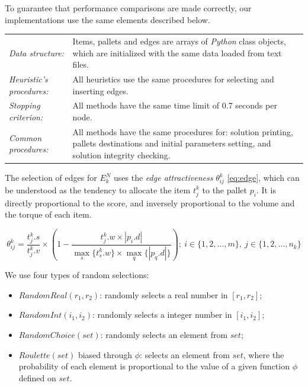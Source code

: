 \documentclass[preprint,authoryear]{elsarticle}
\begin{document}
To guarantee that performance comparisons are made correctly, our implementations use the same elements described below.


\bgroup
\def\arraystretch{1.2}
\begin{table}[H]
	\centering
	\small
	\begin{tabular}{CD}
		
		{\it Data structure:}     & Items, pallets and edges are arrays of \emph{Python} class objects, which are initialized with the same data loaded from text files. \\
		
		{\it Heuristic's procedures:}  & All heuristics use the same procedures for selecting and inserting edges.  \\	
		
		{\it Stopping criterion:} & All methods have the same time limit of $0.7$ seconds per node.\\
		
		{\it Common procedures:}  & All methods have the same procedures for: solution printing, pallets destinations and initial parameters setting, and solution integrity checking.\\

	\end{tabular}
	\normalsize
\end{table}
\egroup

The selection of edges for $E^N_k$\/ uses the {\it edge attractiveness}\/ $\theta^k_{ij}$\/ \ref{eq:edge}, which can be understood as the tendency to allocate the item $t^k_j$\/ to the pallet $p_i$. It is directly proportional to the score, and inversely proportional to the volume and the torque of each item.

\begin{equation} \label{eq:edge}
	\theta^k_{ij}= \frac{t^k_j.s}{t^k_j.v}\times(1-\frac{t^k_j.w\times|p_i.d|}{\max_s\{t^k_s.w\}\times\max_q\{|p_q.d|\}});\ i \in \{1,2,\ldots,m\},\ j \in \{1,2,\ldots,n_k\}
\end{equation} 


We use four types of random selections:
\begin{itemize}
	\item $RandomReal(r_1,r_2)$: randomly selects a real number in $[r_1,r_2]$;
	\item $RandomInt(i_1,i_2)$: randomly selects a integer number in $[i_1,i_2]$;
	\item $RandomChoice(set)$: randomly selects an element from $set$;
	\item $Roulette(set)$ biased through $\phi$: selects an element from $set$, where the probability of each element is proportional to the value of a given function $\phi$\/ defined on $set$.
\end{itemize}
\end{document}
